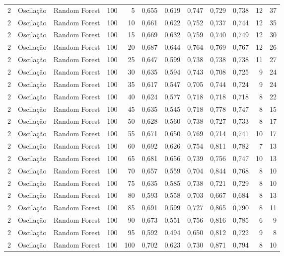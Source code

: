 \begin{longtable}{@{}rllrrrrrrrrr@{}}
2 & Oscilação & Random Forest & 100 & 5 & 0,655 & 0,619 & 0,747 & 0,729 & 0,738 & 12 & 37 \\
2 & Oscilação & Random Forest & 100 & 10 & 0,661 & 0,622 & 0,752 & 0,737 & 0,744 & 12 & 35 \\
2 & Oscilação & Random Forest & 100 & 15 & 0,669 & 0,632 & 0,759 & 0,740 & 0,749 & 12 & 30 \\
2 & Oscilação & Random Forest & 100 & 20 & 0,687 & 0,644 & 0,764 & 0,769 & 0,767 & 12 & 26 \\
2 & Oscilação & Random Forest & 100 & 25 & 0,647 & 0,599 & 0,738 & 0,738 & 0,738 & 11 & 27 \\
2 & Oscilação & Random Forest & 100 & 30 & 0,635 & 0,594 & 0,743 & 0,708 & 0,725 & 9 & 24 \\
2 & Oscilação & Random Forest & 100 & 35 & 0,617 & 0,547 & 0,705 & 0,744 & 0,724 & 9 & 24 \\
2 & Oscilação & Random Forest & 100 & 40 & 0,624 & 0,577 & 0,718 & 0,718 & 0,718 & 8 & 22 \\
2 & Oscilação & Random Forest & 100 & 45 & 0,635 & 0,545 & 0,718 & 0,778 & 0,747 & 8 & 15 \\
2 & Oscilação & Random Forest & 100 & 50 & 0,628 & 0,560 & 0,738 & 0,727 & 0,733 & 8 & 17 \\
2 & Oscilação & Random Forest & 100 & 55 & 0,671 & 0,650 & 0,769 & 0,714 & 0,741 & 10 & 17 \\
2 & Oscilação & Random Forest & 100 & 60 & 0,692 & 0,626 & 0,754 & 0,811 & 0,782 & 7 & 13 \\
2 & Oscilação & Random Forest & 100 & 65 & 0,681 & 0,656 & 0,739 & 0,756 & 0,747 & 10 & 13 \\
2 & Oscilação & Random Forest & 100 & 70 & 0,657 & 0,559 & 0,704 & 0,844 & 0,768 & 8 & 10 \\
2 & Oscilação & Random Forest & 100 & 75 & 0,635 & 0,585 & 0,738 & 0,721 & 0,729 & 8 & 10 \\
2 & Oscilação & Random Forest & 100 & 80 & 0,593 & 0,558 & 0,703 & 0,667 & 0,684 & 8 & 13 \\
2 & Oscilação & Random Forest & 100 & 85 & 0,691 & 0,599 & 0,727 & 0,865 & 0,790 & 8 & 11 \\
2 & Oscilação & Random Forest & 100 & 90 & 0,673 & 0,551 & 0,756 & 0,816 & 0,785 & 6 & 9 \\
2 & Oscilação & Random Forest & 100 & 95 & 0,592 & 0,494 & 0,650 & 0,812 & 0,722 & 9 & 8 \\
2 & Oscilação & Random Forest & 100 & 100 & 0,702 & 0,623 & 0,730 & 0,871 & 0,794 & 8 & 10 \\

\end{longtable}
